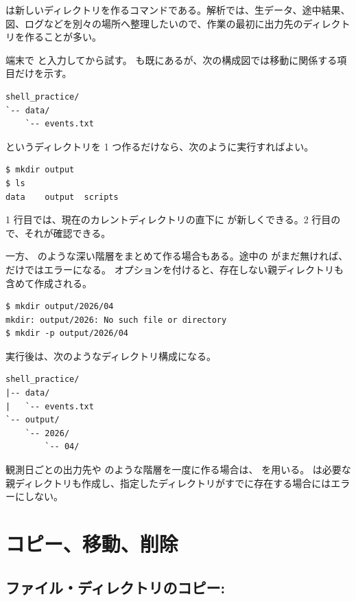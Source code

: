  は新しいディレクトリを作るコマンドである。解析では、生データ、途中結果、図、ログなどを別々の場所へ整理したいので、作業の最初に出力先のディレクトリを作ることが多い。

端末で  と入力してから試す。 も既にあるが、次の構成図では移動に関係する項目だけを示す。

\begin{lstlisting}[numbers=none, xleftmargin=2\zw]
shell_practice/
`-- data/
    `-- events.txt
\end{lstlisting}

 というディレクトリを 1 つ作るだけなら、次のように実行すればよい。

\begin{lstlisting}[numbers=none, xleftmargin=2\zw]
$ mkdir output
$ ls
data	output	scripts
\end{lstlisting}

1 行目では、現在のカレントディレクトリの直下に  が新しくできる。2 行目の  で、それが確認できる。

一方、 のような深い階層をまとめて作る場合もある。途中の  がまだ無ければ、 だけではエラーになる。 オプションを付けると、存在しない親ディレクトリも含めて作成される。

\begin{lstlisting}[numbers=none, xleftmargin=2\zw]
$ mkdir output/2026/04
mkdir: output/2026: No such file or directory
$ mkdir -p output/2026/04
\end{lstlisting}

実行後は、次のようなディレクトリ構成になる。

\begin{lstlisting}[numbers=none, xleftmargin=2\zw]
shell_practice/
|-- data/
|   `-- events.txt
`-- output/
    `-- 2026/
        `-- 04/
\end{lstlisting}

観測日ごとの出力先や  のような階層を一度に作る場合は、 を用いる。 は必要な親ディレクトリも作成し、指定したディレクトリがすでに存在する場合にはエラーにしない。

\section{コピー、移動、削除}

\subsection{ファイル・ディレクトリのコピー: }

